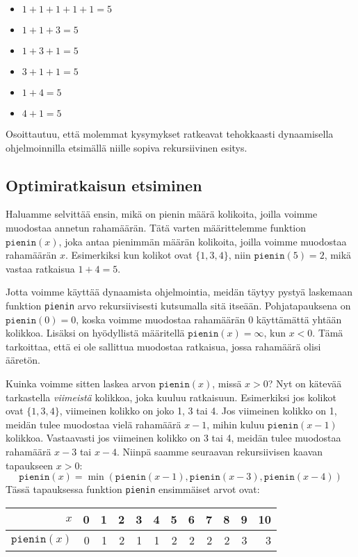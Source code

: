 \begin{multicols}{2}
\begin{itemize}
\item $1+1+1+1+1=5$
\item $1+1+3=5$
\item $1+3+1=5$
\item $3+1+1=5$
\item $1+4=5$
\item $4+1=5$
\end{itemize}
\end{multicols}

Osoittautuu, että molemmat kysymykset ratkeavat tehokkaasti
dynaamisella ohjelmoinnilla
etsimällä niille sopiva rekursiivinen esitys.

\subsection{Optimiratkaisun etsiminen}

Haluamme selvittää ensin, mikä on pienin määrä
kolikoita, joilla voimme muodostaa annetun rahamäärän.
Tätä varten määrittelemme funktion $\texttt{pienin}(x)$,
joka antaa pienimmän määrän kolikoita, joilla voimme
muodostaa rahamäärän $x$.
Esimerkiksi kun kolikot ovat $\{1,3,4\}$,
niin $\texttt{pienin}(5)=2$, mikä vastaa ratkaisua $1+4=5$.

Jotta voimme käyttää dynaamista ohjelmointia,
meidän täytyy pystyä laskemaan funktion \texttt{pienin}
arvo rekursiivisesti kutsumalla sitä itseään.
Pohjatapauksena on $\texttt{pienin}(0)=0$, koska voimme
muodostaa rahamäärän 0 käyttämättä yhtään kolikkoa.
Lisäksi on hyödyllistä määritellä $\texttt{pienin}(x)=\infty$,
kun $x<0$. Tämä tarkoittaa, että ei ole sallittua muodostaa
ratkaisua, jossa rahamäärä olisi ääretön.

Kuinka voimme sitten laskea arvon $\texttt{pienin}(x)$,
missä $x>0$? Nyt on kätevää tarkastella \emph{viimeistä}
kolikkoa, joka kuuluu ratkaisuun.
Esimerkiksi jos kolikot ovat $\{1,3,4\}$, viimeinen kolikko
on joko 1, 3 tai 4.
Jos viimeinen kolikko on 1, meidän tulee muodostaa vielä
rahamäärä $x-1$, mihin kuluu $\texttt{pienin}(x-1)$ kolikkoa.
Vastaavasti jos viimeinen kolikko on 3 tai 4,
meidän tulee muodostaa rahamäärä $x-3$ tai $x-4$.
Niinpä saamme seuraavan rekursiivisen kaavan tapaukseen $x>0$:
\[
\texttt{pienin}(x) =
    \min(\texttt{pienin}(x-1),\texttt{pienin}(x-3),\texttt{pienin}(x-4))
\]
Tässä tapauksessa funktion \texttt{pienin} ensimmäiset arvot ovat:

\begin{center}
\begin{tabular}{rrrrrrrrrrrr}
$x$ & 0 & 1 & 2 & 3 & 4 & 5 & 6 & 7 & 8 & 9 & 10 \\
\hline
$\texttt{pienin}(x)$ & 0 & 1 & 2 & 1 & 1 & 2 & 2 & 2 & 2 & 3 & 3 \\
\end{tabular}
\end{center}


